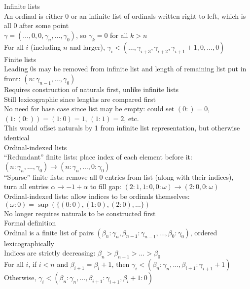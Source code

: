 \documentclass{article}
\newcommand{\w}{\omega}
\begin{document}
\newcommand{\hopen}[1]{[#1)}
  \newcommand{\indentsarewack}{]}

Infinite lists \\
An ordinal is either 0 or an infinite list of ordinals written right to left,
which is all 0 after some point \\
$\gamma = (\ldots, 0, 0, \gamma_n, \ldots, \gamma_0)$,
so $\gamma_k = 0$ for all $k > n$ \\
For all $i$ (including $n$ and larger),
$\gamma_i < (\ldots, \gamma_{i+3}, \gamma_{i+2}, \gamma_{i+1}+1, 0, \ldots, 0)$ \\

Finite lists \\
Leading 0s may be removed from infinite list and length of remaining list put in front:
$(n: \gamma_{n-1}, \ldots, \gamma_0)$ \\
Requires construction of naturals first, unlike infinite lists \\
Still lexicographic since lengths are compared first \\
No need for base case since list may be empty:
could set $(0:)=0$, $(1: (0:))=(1: 0)=1$, $(1: 1)=2$, etc. \\
This would offset naturals by 1 from infinite list representation,
but otherwise identical \\

Ordinal-indexed lists \\
``Redundant'' finite lists: place index of each element before it:
$(n: \gamma_n, \ldots, \gamma_0) \rightarrow (n: \gamma_n, \ldots, 0: \gamma_0)$ \\
``Sparse'' finite lists: remove all 0 entries from list (along with their indices), \\
turn all entries $\alpha \rightarrow -1+\alpha$ to fill gap:
$(2: 1, 1: 0, 0: \w) \rightarrow (2: 0, 0: \w)$ \\
Ordinal-indexed lists: allow indices to be ordinals themselves:
$(\omega: 0) = \sup(\{(0: 0), (1: 0), (2: 0), \ldots\})$ \\
No longer requires naturals to be constructed first \\

Formal definition \\
Ordinal is a finite list of pairs
$(\beta_n: \gamma_n, \beta_{n-1}: \gamma_{n-1}, \ldots, \beta_0: \gamma_0)$,
ordered lexicographically \\
Indices are strictly decreasing: $\beta_n > \beta_{n-1} > \ldots > \beta_0$ \\
For all $i$, if $i < n$ and $\beta_{i+1}=\beta_i+1$, then
$\gamma_i < (\beta_n: \gamma_n, \ldots, \beta_{i+1}: \gamma_{i+1}+1)$ \\
Otherwise, $\gamma_i < (\beta_n: \gamma_n, \ldots, \beta_{i+1}: \gamma_{i+1}, \beta_i+1: 0)$ \\
\end{document}
